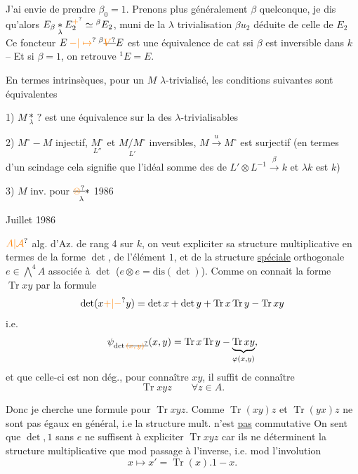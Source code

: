 J'ai envie de prendre $\beta_0=1$. Prenons plus généralement $\beta$ quelconque, je dis qu'alors $E_\beta\mathbin{\underset{\lambda}{*}}E_2^{\unsure{+}}\simeq{}^{\beta}E_2$, muni de la $\lambda$ trivialisation $\beta u_2$ déduite de celle de $E_2$
Ce foncteur $E\mathbin{\unsure{-|\mapsto}}{}^\beta\deleted{\unsure{V}}E$  est une équivalence de cat ssi $\beta$ est inversible dans $k$ -- Et si $\beta=1$, on retrouve $\mathord{}^1E=E$.

En termes intrinsèques, pour  un $M$ $\lambda$-trivialisé, les conditions suivantes sont équivalentes

1) $M\mathbin{\underset{\lambda}{*}}\,?$ est une équivalence sur la  des $\lambda$-trivialisables

2) $M^\circ\mathbin{-}M$ injectif, $\underset{L''}{M^\circ}$ et $\underset{L'}{M/M^\circ}$ inversibles, $M\xrightarrow{u}M^\circ$ est surjectif
(en termes d'un scindage cela signifie que l'idéal somme des  de $L'\otimes L^{-1}\xrightarrow{\beta} k$ et $\lambda k$ est $k$)

3) $M$ inv. pour $\mathbin{\underset{\lambda}{\deleted{\unsure{\otimes}}*}}$
\hfill {} 1986\par
\hfill Juillet 1986

$\unsure{A|\mathcal A}$ alg. d'Az. de rang 4 sur $k$, on veut expliciter sa structure multiplicative en termes de la forme $\det$, de l'élément $1$, et de la structure \uline{spéciale} orthogonale $e\in\bigwedge^4 A$   associée à $\det$ ($e\otimes e=\mathrm{dis}(\det)$). Comme on connait la forme $\operatorname{Tr}xy$ par la formule
\[
 \det(x\unsure{+|-}y)=\det x+\det y+\operatorname{Tr}x\operatorname{Tr}y-\operatorname{Tr}xy
\]
i.e.
\[
 \psi_{\det\deleted{\unsure{(x,y)}}}(x,y)=\operatorname{Tr}x\operatorname{Tr}y-\underbrace{\operatorname{Tr}xy}_{\varphi(x,y)},
\]
 et que celle-ci est non dég., pour connaître $xy$, il suffit de connaître
\[
 \operatorname{Tr}xyz\qquad\forall z\in A.
\]

Donc je cherche une formule pour $\operatorname{Tr}xyz$. Comme $\operatorname{Tr}(xy)z$ et $\operatorname{Tr}(yx)z$ ne sont pas égaux en général, i.e la structure mult.  n'est \uline{pas} commutative
 On sent que $\det,1$ sans $e$ ne suffisent à expliciter $\operatorname{Tr}xyz$ car ils ne déterminent la structure multiplicative que mod passage à l'inverse, i.e. mod l'involution
\[
 x\longmapsto x'=\operatorname{Tr}(x).1-x.
\]

